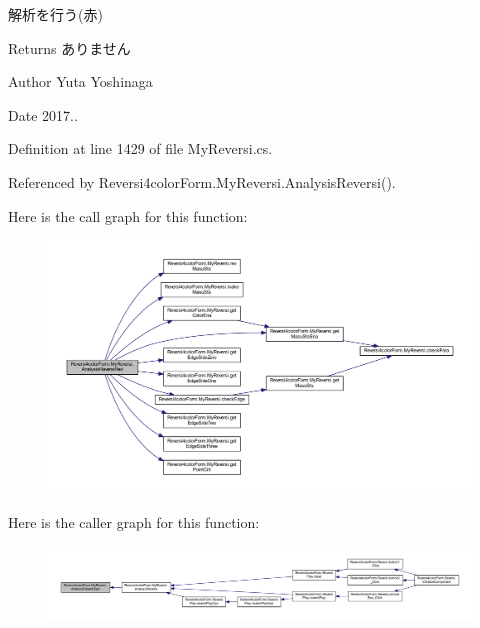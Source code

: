 解析を行う(赤) 

\begin{DoxyReturn}{Returns}
ありません 
\end{DoxyReturn}
\begin{DoxyAuthor}{Author}
Yuta Yoshinaga 
\end{DoxyAuthor}
\begin{DoxyDate}{Date}
2017.. 
\end{DoxyDate}


Definition at line 1429 of file My\+Reversi.\+cs.



Referenced by Reversi4color\+Form.\+My\+Reversi.\+Analysis\+Reversi().

Here is the call graph for this function\+:\nopagebreak
\begin{figure}[H]
\begin{center}
\leavevmode
\includegraphics[width=350pt]{class_reversi4color_form_1_1_my_reversi_a2d0c12ed7036def583e06ca4df37f367_cgraph}
\end{center}
\end{figure}
Here is the caller graph for this function\+:\nopagebreak
\begin{figure}[H]
\begin{center}
\leavevmode
\includegraphics[width=350pt]{class_reversi4color_form_1_1_my_reversi_a2d0c12ed7036def583e06ca4df37f367_icgraph}
\end{center}
\end{figure}
\mbox{\label{class_reversi4color_form_1_1_my_reversi_a61ca891ff78c7357ab077ce7bd3cbf97}} 
